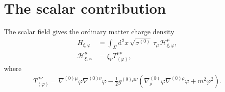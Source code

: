 \documentclass[11pt]{article}
\newcommand{\dd}{\mathrm{d}}
\newcommand{\cH}{\mathcal{H}}
\begin{document}
\section*{The scalar contribution}

The scalar field gives the ordinary matter charge density
\begin{align}
  H_{\xi,\varphi}
  &=\int_\Sigma\dd^2x\,\sqrt{\sigma^{(0)}}\,\tau_\mu
    \cH^\mu_{\xi,\varphi},\\
  \cH^\mu_{\xi,\varphi}
  &=\xi_\nu T_{(\varphi)}^{\mu\nu},
\end{align}
where
\begin{align}
  T_{(\varphi)}^{\mu\nu}
  =\nabla^{(0)\mu}\varphi\nabla^{(0)\nu}\varphi
   -\frac12g^{(0)\mu\nu}
    \left(
      \nabla^{(0)}_\rho\varphi\nabla^{(0)\rho}\varphi
      +m^2\varphi^2
    \right).
\end{align}
\end{document}
